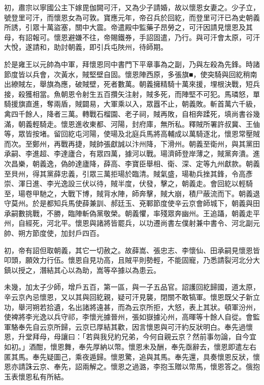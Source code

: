 \begin{pinyinscope}
 初，肅宗以寧國公主下嫁毘伽闕可汗，又為少子請婚，故以懷恩女妻之。少子立，號登里可汗，而懷恩女為可敦。寶應元年，帝召兵於回紇，而登里可汗已為史朝義所誘，引眾十萬盜塞，關中大震。帝遣殿中監藥子昂勞之，可汗因請見懷恩及其母，有詔報可。懷恩避嫌不往，帝賜鐵券，手詔固遣，乃行。與可汗會太原，可汗大悅，遂請和，助討朝義，即引兵屯陜州，待師期。



 於是雍王以元帥為中軍，拜懷恩同中書門下平章事為之副，乃與左殺為先鋒。時諸節度皆以兵會，次黃水，賊堅壁自固。懷恩陣西原，多張旗■，使突騎與回紇稍南出繚賊左，舉旗為應，破賊壁，死者數萬。朝義擁精騎十萬來援，埋根決戰，短兵接，殺獲相當。魚朝恩令射生五百攢矢注射，賊多死，而陣堅不可犯。馬璘怒，單騎援旗直進，奪兩盾，賊闢易，大軍乘以入，眾囂不止，朝義敗。斬首萬六千級，禽四千餘人，降者三萬。轉戰石榴園、老子祠，賊再敗，自相奔蹂死，填尚書谷幾滿，朝義輕騎走。懷恩進收東都、河陽，封府庫，無所私。釋賊所署許叔冀、王伷等，眾皆按堵。留回紇屯河陽，使瑒及北庭兵馬將高輔成以萬騎逐北，懷恩常壓賊而次。至鄭州，再戰再捷，賊帥張獻誠以汴州降，下滑州。朝義至衛州，與其黨田承嗣、李進超、李達廬合，有眾四萬，據河以戰。瑒濟師登岸薄之，賊黨奔潰。進次昌樂，朝義逸，偽帥達廬降，薛高、李寶臣舉相、衛、深、定等九州獻款。朝義至貝州，得其黨薛忠義，引眾三萬拒瑒於臨清。賊氣盛，瑒勒兵挫其鋒，令高彥崇、渾日進、李光逸設三伏以待，賊半度，伏發，擊之，朝義走。會回紇以輕騎至，瑒卷甲馳之，大戰下博，賊背水陣，師奔擊，賊大崩，積尸蔽流而下。朝義退守莫州。於是都知兵馬使薛兼訓、郝廷玉、兗鄆節度使辛云京會師城下，朝義與田承嗣數挑戰，不勝，臨陣斬偽黨敬榮。朝義懼，率殘眾奔幽州。王追躡，朝義走平州，自經死，河北平。懷恩與諸將皆罷兵，以功遷尚書左僕射兼中書令、河北副元帥、朔方節度使，加封戶四百。



 初，帝有詔但取朝義，其它一切赦之。故薛嵩、張忠志、李懷仙、田承嗣見懷恩皆叩頭，願效力行伍。懷恩自見功高，且賊平則勢輕，不能固寵，乃悉請裂河北分大鎮以授之，潛結其心以為助，嵩等卒據以為患云。



 未幾，加太子少師，增戶五百，第一區，與一子五品官。詔護回紇歸國，道太原，辛云京內忌懷恩，又以其與回紇親，疑可汗見襲，閉關不敢犒軍。懷恩既父子新立功，舉河朔若拾遺，名出諸將遠甚，而為云京所拒，大怒，表上其狀。頓軍汾州，使裨將李光逸以兵守祁，李懷光據晉州，張如嶽據沁州，高暉等十餘人自從。會監軍駱奉先自云京所歸，云京已厚結其歡，因言懷恩與可汗約反狀明白。奉先過懷恩，升堂拜母，母讓曰：「若與我兒約兄弟，今何自親云京？然前事勿論，自今宜如初。」酒酣，懷恩舞，奉先厚納以幣。懷恩未及酬，奉先亟辭去，懷恩即遣左右匿其馬。奉先疑圖己，乘夜遁歸。懷恩驚，追與其馬。奉先還，具奏懷恩反狀，懷恩亦請誅云京、奉先，詔兩解之。懷恩之過潞，李抱玉贈以幣馬，懷恩答之。俄抱玉表懷恩私有所結。




\end{pinyinscope}
